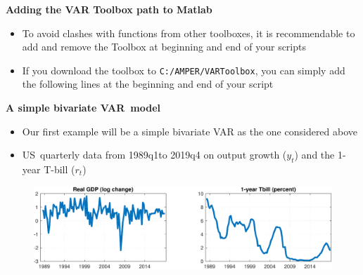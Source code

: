 
\begin{frame}
{\textbf{Adding the VAR Toolbox path to Matlab}}\bigskip \bigskip \smallskip 

\begin{itemize}
\item To avoid clashes with functions from other toolboxes, it is
recommendable to add and remove the Toolbox at beginning and end of your
scripts\bigskip

\item If you download the toolbox to \texttt{C:/AMPER/VARToolbox}, you can
simply add the following lines at the beginning and end of your
script\bigskip

\begin{minipage}[b]{.9\textwidth}
\end{minipage}
\end{itemize}
\end{frame}


\begin{frame}
{\textbf{A simple bivariate VAR\ model}}\medskip

\begin{itemize}
\item Our first example will be a simple bivariate VAR as the one considered
above \bigskip

\item US\ quarterly data from 1989q1to 2019q4 on output growth ($y_{t}$) and
the 1-year T-bill ($r_{t}$)\bigskip
\end{itemize}

\begin{figure}[h]
\centering\includegraphics[width=.85\textwidth]{DATA_BivariateVAR.pdf}
\end{figure}
\end{frame}

